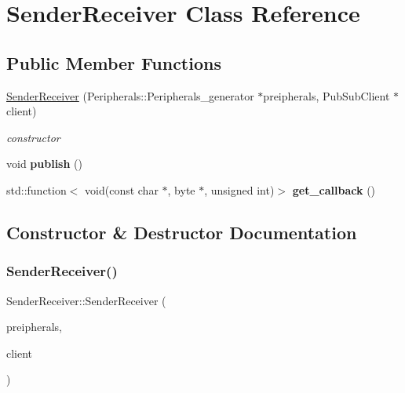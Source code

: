 \hypertarget{class_sender_receiver}{}\section{Sender\+Receiver Class Reference}
\label{class_sender_receiver}
\subsection*{Public Member Functions}
\begin{DoxyCompactItemize}
\item 
\hyperlink{class_sender_receiver_a71cac4950b67ac7fef6e6ceac17bd2ac}{Sender\+Receiver} (Peripherals\+::\+Peripherals\+\_\+generator $\ast$preipherals, Pub\+Sub\+Client $\ast$client)
\begin{DoxyCompactList}\small\item\em constructor \end{DoxyCompactList}\item 
\mbox{\label{class_sender_receiver_aff1084f973f9d5f05defd3455381e9fb}} 
void {\bfseries publish} ()
\item 
\mbox{\label{class_sender_receiver_ae6d1f7b556cfb65549ddb7366fcf1138}} 
std\+::function$<$ void(const char $\ast$, byte $\ast$, unsigned int)$>$ {\bfseries get\+\_\+callback} ()
\end{DoxyCompactItemize}


\subsection{Constructor \& Destructor Documentation}
\mbox{\label{class_sender_receiver_a71cac4950b67ac7fef6e6ceac17bd2ac}} 
\subsubsection{\texorpdfstring{Sender\+Receiver()}{SenderReceiver()}}
{\footnotesize\ttfamily Sender\+Receiver\+::\+Sender\+Receiver (\begin{DoxyParamCaption}\item[{Peripherals\+::\+Peripherals\+\_\+generator $\ast$}]{preipherals,  }\item[{Pub\+Sub\+Client $\ast$}]{client }\end{DoxyParamCaption})}



